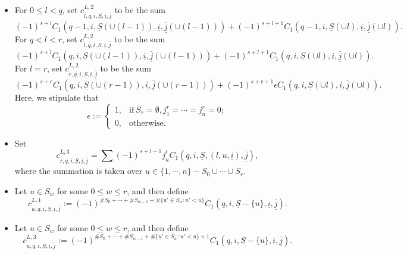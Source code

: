 \documentclass[12pt, a4paper]{article}
\begin{document}
\begin{itemize}
\item For $0\leq l<q$, set $c^{L,2}_{l,q,i,\underline S,\underline i,\underline{\overline j}}$ to be the sum 
$$
(-1)^{s+l}C_1(q-1,i,\underline S(\cup(l-1)),\underline i,\overline{\underline j}(\cup(l-1)))+(-1)^{s+l+1}C_1(q-1,i,\underline S(\cup l),\underline i,\overline{\underline j}(\cup l)).
$$
For $q<l<r$, set $c^{L,2}_{l,q,i,\underline S,\underline i,\underline{\overline j}}$ to be the sum 
$$
(-1)^{s+l}C_1(q,i,\underline S(\cup(l-1)),\underline i,\overline{\underline j}(\cup(l-1)))+(-1)^{s+l+1}C_1(q,i,\underline S(\cup l),\underline i,\overline{\underline j}(\cup l)).
$$
For $l=r$, set $c^{L,2}_{r,q,i,\underline S,\underline i,\underline{\overline j}}$ to be the sum 
$$
(-1)^{s+r}C_1(q,i,\underline S(\cup(r-1)),\underline i,\overline{\underline j}(\cup(r-1)))+(-1)^{s+r+1}\epsilon C_1(q,i,\underline S(\cup l),\underline i,\overline{\underline j}(\cup l)).
$$
Here, we stipulate that 
$$
\epsilon:=\left\{
\begin{matrix}
1,&\mathrm{if}~S_r=\emptyset, j^r_1=\cdots=j^r_n=0;\\
0,&\mathrm{otherwise}.
\end{matrix}
\right.
$$

\item Set 
$$c^{L,3}_{r,q,i,\underline S,\underline i,\underline{\overline j}}=\sum (-1)^{s+l-1}j^l_uC_1(q,i,\underline S,(l,u,\underline i),\overline{\underline j}),$$
where the summation is taken over $u\in\{1,\cdots,n\}-S_0\cup\cdots\cup S_r$.

\item Let $u\in S_w$ for some $0\leq w\leq r$, and then define
$$c^{L,1}_{u,q,i,\underline S,\underline i,\underline{\overline j}}:=(-1)^{\#S_0+\cdots+\#S_{w-1}+\#\{u'\in S_w:u'<u\}}C_1(q,i,\underline S-\{u\},\underline i,\overline{\underline j}).
$$

\item Let $u\in S_w$ for some $0\leq w\leq r$, and then define 
$$c^{L,3}_{u,q,i,\underline S,\underline i,\underline{\overline j}}:=(-1)^{\#S_0+\cdots+\#S_{w-1}+\#\{u'\in S_w:u'<u\}+1}C_1(q,i,\underline S-\{u\},\underline i,\overline{\underline j}).
$$
\end{itemize}
\end{document}
